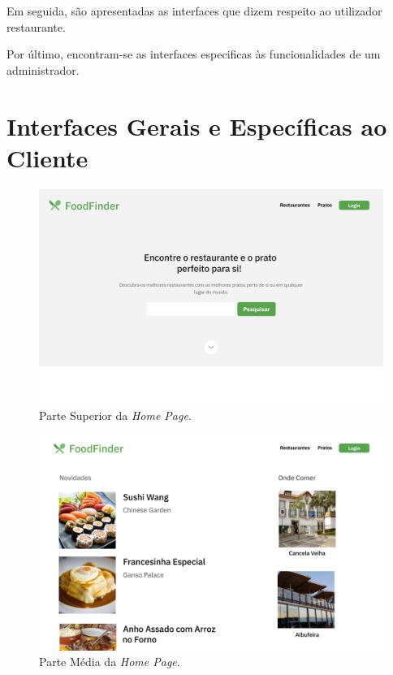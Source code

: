\documentclass[a4paper,12pt]{report}
\begin{document}
	Em seguida, são apresentadas as interfaces que dizem respeito ao utilizador restaurante. 
	
	Por último, encontram-se as interfaces especificas às funcionalidades de um administrador.	
	
\section{Interfaces Gerais e Específicas ao Cliente}
	
	\begin{figure}[H]
	\begin{center}
	\includegraphics[scale=0.25]{1.1-Screen1}	
	\end{center}
	\caption{Parte Superior da \textit{Home Page}.}
	\end{figure} 
	
	\begin{figure}[H]
	\begin{center}
	\includegraphics[scale=0.25]{2.1-Screen2}	
	\end{center}
	\caption{Parte Média da \textit{Home Page}.}
	\end{figure} 
	
\end{document}
